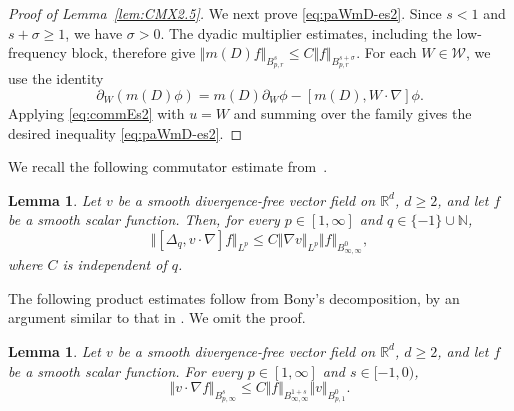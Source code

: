 \documentclass[reqno,11pt,a4paper]{amsart}
\newtheorem{lemma}[theorem]{Lemma}
\newcommand{\R}{\ensuremath{\mathbb{R}}}
\begin{document}
\begin{proof}[Proof of Lemma~\ref{lem:CMX2.5}]
We next prove \eqref{eq:paWmD-es2}.
Since $s<1$ and $s+\sigma\geq1$, we have $\sigma>0$.
The dyadic multiplier estimates, including the
low-frequency block, therefore give
$\Vert m(D)f\Vert _{B^s_{p,r}}\leq C\Vert f\Vert _{B^{s+\sigma}_{p,r}}$.
For each $W\in\mathcal W$, we use the identity
\[
  \partial_W(m(D)\phi)
  =
  m(D)\partial_W\phi-[m(D),W\cdot\nabla]\phi.
\]
Applying \eqref{eq:commEs2} with $u=W$
and summing over the family gives the desired inequality \eqref{eq:paWmD-es2}.
\end{proof}

We recall the following commutator estimate
from~\cite[Lemma~6.10(1)]{HKR10}.
\begin{lemma}\label{lem:HKR}
Let $v$ be a smooth divergence-free vector field
on $\R^d$, $d\geq2$, and let $f$ be a smooth scalar function.
Then, for every $p\in[1,\infty]$
and $q\in\{-1\}\cup\mathbb N$,
\[
  \Vert [\Delta_q,v\cdot\nabla]f\Vert _{L^p}
  \leq C\Vert \nabla v\Vert _{L^p}
  \Vert f\Vert _{B^0_{\infty,\infty}},
\]
where $C$ is independent of $q$.
\end{lemma}

The following product estimates follow from Bony's decomposition,
by an argument similar to that in
\cite[Lemma~6.10(2)]{HKR10}.
We omit the proof.
\begin{lemma}\label{lem-610-2}
Let $v$ be a smooth divergence-free vector field
on $\R^d$, $d\geq2$, and let $f$ be a smooth scalar function.
For every $p\in[1,\infty]$ and $s\in[-1,0)$,
\[
  \Vert v\cdot\nabla f\Vert _{B^s_{p,\infty}}
  \leq C\Vert f\Vert _{B^{1+s}_{\infty,\infty}}
  \Vert v\Vert _{B^0_{p,1}}.
\]
\end{lemma}
\end{document}
